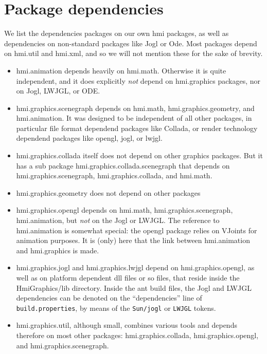 \section{Package dependencies}
We list the dependencies packages on our own hmi packages, as well as dependencies on non-standard
packages like Jogl or Ode.
Most packages depend on hmi.util and hmi.xml, and so we will not mention these for the sake of brevity.
\begin{itemize}
\item hmi.animation depends heavily on hmi.math. Otherwise it is quite independent, and it
 does explicitly \emph{not} depend on hmi.graphics packages,
nor on Jogl, LWJGL, or ODE.

\item hmi.graphics.scenegraph depends on hmi.math, hmi.graphics.geometry, and hmi.animation. It was designed to be independent of all other packages, in particular file format dependend packages like Collada, or render technology dependend packages like opengl, jogl, or lwjgl.

\item hmi.graphics.collada itself does not depend on other graphics packages. But it has a sub package hmi.graphics.collada.scenegraph that depends on hmi.graphics.scenegraph, hmi.graphics.collada, and hmi.math.

\item hmi.graphics.geometry does not depend on other packages

\item hmi.graphics.opengl depends on hmi.math, hmi.graphics.scenegraph, hmi.animation,
but \emph{not} on the Jogl or LWJGL.
The reference to hmi.animation is somewhat special:
the opengl package relies on VJoints for animation purposes. It is (only) here that the link between hmi.animation and
hmi.graphics is made.

\item hmi.graphics.jogl and hmi.graphics.lwjgl depend on hmi.graphics.opengl, as well as
on platform dependent dll files or so files, that reside inside the HmiGraphics/lib directory.
Inside the ant build files, the Jogl and LWJGL  dependencies can be denoted on
the ``dependencies'' line of \verb"build.properties", by means of the  \verb"Sun/jogl" or  \verb"LWJGL" tokens.
\item hmi.graphics.util, although small, combines various tools  and depends therefore on most other packages:
hmi.graphics.collada, hmi.graphics.opengl, and hmi.graphics.scenegraph.

\end{itemize}